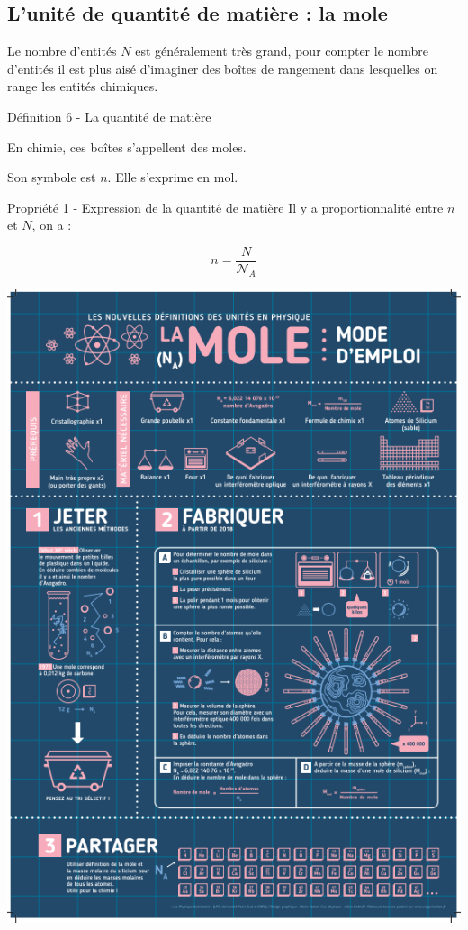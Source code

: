 \documentclass[french, a4paper, 12pt, landscape, twocolumn]{article}
\begin{document}
\subsection{L'unité de quantité de matière : la mole}

Le nombre d'entités $N$ est généralement très grand, pour compter le nombre d'entités il est plus aisé d'imaginer des boîtes de rangement dans lesquelles on range les entités chimiques.

\begin{definition}{Définition 6 - La quantité de matière}
	\medskip

	En chimie, ces boîtes s'appellent des moles.\medskip
	
	Son symbole est $n$. Elle s'exprime en mol. 
\end{definition}

\begin{Proposition}{Propriété 1 - Expression de la quantité de matière}
	Il y a proportionnalité entre $n$ et $N$, on a : 

	$$n=\dfrac{N}{\mathcal{N}_A}$$
\end{Proposition}

\begin{center}
\includegraphics[width=.35\textwidth]{Lamole.png}
\end{center}
\end{document}

